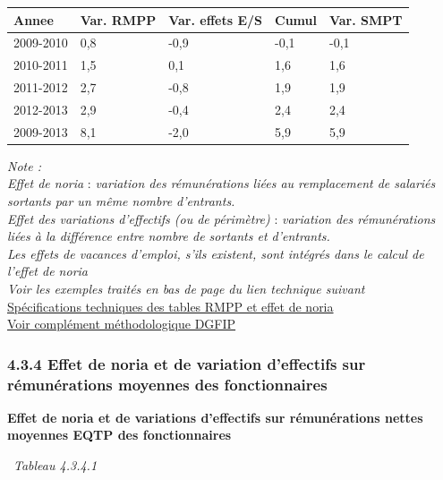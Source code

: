 \begin{longtable}[]{@{}lllll@{}}
\toprule
Annee & Var. RMPP & Var. effets E/S & Cumul & Var. SMPT\tabularnewline
\midrule
\endhead
2009-2010 & 0,8 & -0,9 & -0,1 & -0,1\tabularnewline
2010-2011 & 1,5 & 0,1 & 1,6 & 1,6\tabularnewline
2011-2012 & 2,7 & -0,8 & 1,9 & 1,9\tabularnewline
2012-2013 & 2,9 & -0,4 & 2,4 & 2,4\tabularnewline
2009-2013 & 8,1 & -2,0 & 5,9 & 5,9\tabularnewline
\bottomrule
\end{longtable}

\emph{Note :}\\
\emph{Effet de noria} : \emph{variation des rémunérations liées au
remplacement de salariés sortants par un même nombre d'entrants.}\\
\emph{Effet des variations d'effectifs (ou de périmètre)} :
\emph{variation des rémunérations liées à la différence entre nombre de
sortants et d'entrants.}\\
\emph{Les effets de vacances d'emploi, s'ils existent, sont intégrés
dans le calcul de l'effet de noria}\\
\emph{Voir les exemples traités en bas de page du lien technique
suivant}\\
\href{../Docs/Notices/noria.html}{Spécifications techniques des tables RMPP
et effet de noria}\\
\href{../Docs/Notices/GVT\%20et\%20noria.pdf}{Voir complément
méthodologique DGFIP}

\hypertarget{effet-de-noria-et-de-variation-deffectifs-sur-remunerations-moyennes-des-fonctionnaires}{%
\subsubsection{4.3.4 Effet de noria et de variation d'effectifs sur
rémunérations moyennes des
fonctionnaires}\label{effet-de-noria-et-de-variation-deffectifs-sur-remunerations-moyennes-des-fonctionnaires}}

\textbf{Effet de noria et de variations d'effectifs sur rémunérations
nettes moyennes EQTP des fonctionnaires}

~\emph{Tableau 4.3.4.1}

